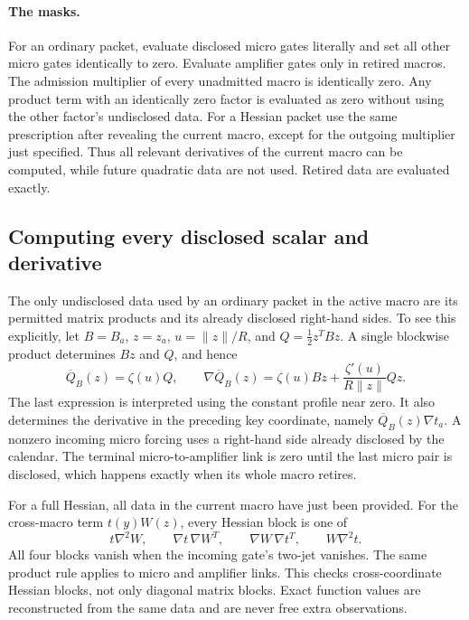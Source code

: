 \documentclass[11pt]{article}
\theoremstyle{definition}
\theoremstyle{remark}
\begin{document}
\paragraph{The masks.}
For an ordinary packet, evaluate disclosed micro gates literally and set all other micro gates identically to zero. Evaluate amplifier gates only in retired macros. The admission multiplier of every unadmitted macro is identically zero. Any product term with an identically zero factor is evaluated as zero without using the other factor's undisclosed data.
For a Hessian packet use the same prescription after revealing the current macro, except for the outgoing multiplier just specified. Thus all relevant derivatives of the current macro can be computed, while future quadratic data are not used. Retired data are evaluated exactly.

\subsection{Computing every disclosed scalar and derivative}
The only undisclosed data used by an ordinary packet in the active macro are its permitted matrix products and its already disclosed right-hand sides. To see this explicitly, let $B=B_a$, $z=z_a$, $u=\|z\|/R$, and $Q=\tfrac12z^TBz$. A single blockwise product determines $Bz$ and $Q$, and hence
\[
 \overline Q_B(z)=\zeta(u)Q,\qquad
 \nabla\overline Q_B(z)=\zeta(u)Bz+
 \frac{\zeta'(u)}{R\|z\|}Qz.
\]
The last expression is interpreted using the constant profile near zero. It also determines the derivative in the preceding key coordinate, namely $\overline Q_B(z)\nabla t_a$. A nonzero incoming micro forcing uses a right-hand side already disclosed by the calendar. The terminal micro-to-amplifier link is zero until the last micro pair is disclosed, which happens exactly when its whole macro retires.

For a full Hessian, all data in the current macro have just been provided. For the cross-macro term $t(y)W(z)$, every Hessian block is one of
\[
 t\nabla^2W,\qquad \nabla t\,\nabla W^T,
 \qquad \nabla W\,\nabla t^T,\qquad W\nabla^2t.
\]
All four blocks vanish when the incoming gate's two-jet vanishes. The same product rule applies to micro and amplifier links. This checks cross-coordinate Hessian blocks, not only diagonal matrix blocks. Exact function values are reconstructed from the same data and are never free extra observations.
\end{document}
